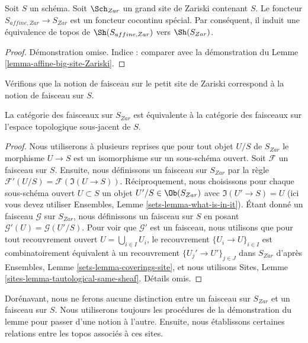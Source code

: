 \begin{lemma}
\label{lemma-alternative-zariski}
Soit $S$ un schéma. Soit $\Sch_{Zar}$ un grand site de Zariski contenant $S$. Le foncteur $S_{affine, Zar} \to S_{Zar}$ est un foncteur cocontinu spécial. Par conséquent, il induit une équivalence de topos de $\Sh(S_{affine, Zar})$ vers $\Sh(S_{Zar})$.
\end{lemma}

\begin{proof}
Démonstration omise. Indice : comparer avec la démonstration du Lemme \ref{lemma-affine-big-site-Zariski}.
\end{proof}


\noindent
Vérifions que la notion de faisceau sur le petit site de Zariski correspond à la notion de faisceau sur $S$.

\begin{lemma}
\label{lemma-Zariski-usual}
La catégorie des faisceaux sur $S_{Zar}$ est équivalente à la catégorie des faisceaux sur l'espace topologique sous-jacent de $S$.
\end{lemma}

\begin{proof}
Nous utiliserons à plusieurs reprises que pour tout objet $U/S$ de $S_{Zar}$ le morphisme $U \to S$ est un isomorphisme sur un sous-schéma ouvert. Soit $\mathcal{F}$ un faisceau sur $S$. Ensuite, nous définissons un faisceau sur $S_{Zar}$ par la règle $\mathcal{F}'(U/S) = \mathcal{F}(\Im(U \to S))$. Réciproquement, nous choisissons pour chaque sous-schéma ouvert $U \subset S$ un objet $U'/S \in \Ob(S_{Zar})$ avec $\Im(U' \to S) = U$ (ici vous devez utiliser Ensembles, Lemme \ref{sets-lemma-what-is-in-it}). Étant donné un faisceau $\mathcal{G}$ sur $S_{Zar}$, nous définissons un faisceau sur $S$ en posant $\mathcal{G}'(U) = \mathcal{G}(U'/S)$. Pour voir que $\mathcal{G}'$ est un faisceau, nous utilisons que pour tout recouvrement ouvert $U = \bigcup_{i \in I} U_i$, le recouvrement $\{U_i \to U\}_{i \in I}$ est combinatoirement équivalent à un recouvrement $\{U_j' \to U'\}_{j \in J}$ dans $S_{Zar}$ d'après Ensembles, Lemme \ref{sets-lemma-coverings-site}, et nous utilisons Sites, Lemme \ref{sites-lemma-tautological-same-sheaf}. Détails omis.
\end{proof}

\noindent
Dorénavant, nous ne ferons aucune distinction entre un faisceau sur $S_{Zar}$ et un faisceau sur $S$. Nous utiliserons toujours les procédures de la démonstration du lemme pour passer d'une notion à l'autre. Ensuite, nous établissons certaines relations entre les topos associés à ces sites.

